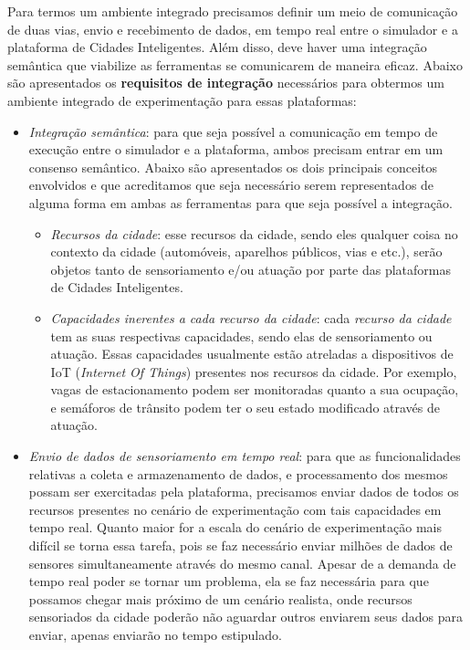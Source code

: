 Para termos um ambiente integrado precisamos definir um meio de comunicação de duas vias, envio e recebimento de dados, em tempo real entre o simulador e a plataforma de Cidades Inteligentes.
Além disso, deve haver uma integração semântica que viabilize as ferramentas se comunicarem de maneira eficaz.
Abaixo são apresentados os \textbf{requisitos de integração} necessários para obtermos um ambiente integrado de experimentação para essas plataformas:

\begin{itemize}
    \item \textit{Integração semântica}: para que seja possível a comunicação em tempo de execução entre o simulador e a plataforma, ambos precisam entrar em um consenso semântico.
        Abaixo são apresentados os dois principais conceitos envolvidos e que acreditamos que seja necessário serem representados de alguma forma em ambas as ferramentas para que seja
        possível a integração.

        \begin{itemize}
            \item \textit{Recursos da cidade}: esse recursos da cidade, sendo eles qualquer coisa no contexto da cidade (automóveis, aparelhos públicos, vias e etc.), serão objetos tanto de
                sensoriamento e/ou atuação por parte das plataformas de Cidades Inteligentes.

            \item \textit{Capacidades inerentes a cada recurso da cidade}: cada \textit{recurso da cidade} tem as suas respectivas capacidades, sendo elas de sensoriamento ou atuação.
                Essas capacidades usualmente estão atreladas a dispositivos de IoT (\textit{Internet Of Things}) presentes nos recursos da cidade.
                Por exemplo, vagas de estacionamento podem ser monitoradas quanto a sua ocupação, e semáforos de trânsito podem ter o seu estado modificado através de atuação.
        \end{itemize}

    \item \textit{Envio de dados de sensoriamento em tempo real}: para que as funcionalidades relativas a coleta e armazenamento de dados, e processamento dos mesmos possam ser
        exercitadas pela plataforma, precisamos enviar dados de todos os recursos presentes no cenário de experimentação com tais capacidades em tempo real.
        Quanto maior for a escala do cenário de experimentação mais difícil se torna essa tarefa, pois se faz necessário enviar milhões de dados de sensores simultaneamente através
        do mesmo canal.
        Apesar de a demanda de tempo real poder se tornar um problema, ela se faz necessária para que possamos chegar mais próximo de um cenário realista, onde recursos sensoriados
        da cidade poderão não aguardar outros enviarem seus dados para enviar, apenas enviarão no tempo estipulado.


\end{itemize}
